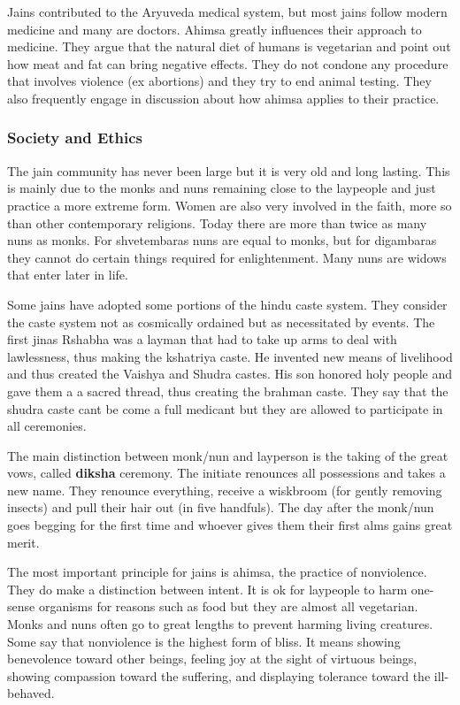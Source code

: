 \documentclass{article}
\begin{document}
Jains contributed to the Aryuveda medical system, but most jains follow modern medicine and many are doctors. Ahimsa greatly influences their approach to medicine. They argue that the natural diet of humans is vegetarian and point out how meat and fat can bring negative effects. They do not condone any procedure that involves violence (ex abortions) and they try to end animal testing. They also frequently engage in discussion about how ahimsa applies to their practice.

\subsubsection{Society and Ethics}
\label{ssub:society_and_ethics}
The jain community has never been large but it is very old and long lasting. This is mainly due to the monks and nuns remaining close to the laypeople and just practice a more extreme form. Women are also very involved in the faith, more so than other contemporary religions. Today there are more than twice as many nuns as monks. For shvetembaras nuns are equal to monks, but for digambaras they cannot do certain things required for enlightenment.  Many nuns are widows that enter later in life.

Some jains have adopted some portions of the hindu caste system. They consider the caste system not as cosmically ordained but as necessitated by events. The first jinas Rshabha was a layman that had to take up arms to deal with lawlessness, thus making the kshatriya caste. He invented new means of livelihood and thus created the Vaishya and Shudra castes. His son honored holy people and gave them a a sacred thread, thus creating the brahman caste. They say that the shudra caste cant be come a full medicant but they are allowed to participate in all ceremonies.

The main distinction between monk/nun and layperson is the taking of the great vows, called \textbf{diksha} ceremony. The initiate renounces all possessions and takes a new name. They renounce everything, receive a wiskbroom (for gently removing insects) and pull their hair out (in five handfuls). The day after the monk/nun goes begging for the first time and whoever gives them their first alms gains great merit.

The most important principle for jains is ahimsa, the practice of nonviolence. They do make a distinction between intent. It is ok for laypeople to harm one-sense organisms for reasons such as food but they are almost all vegetarian. Monks and nuns often go to great lengths to prevent harming living creatures. Some say that nonviolence is the highest form of bliss. It means showing benevolence toward other beings, feeling joy at the sight of virtuous beings, showing compassion toward the suffering, and displaying tolerance toward the ill-behaved.
\end{document}
